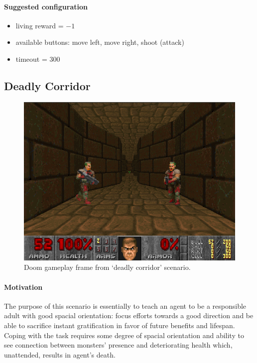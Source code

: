 \documentclass[english,bachelor,a4paper,twoside]{ppfcmthesis}
\begin{document}
		\paragraph{Suggested configuration}
			\begin{itemize}
				\item living reward = $-1$
				\item available buttons: move left, move right, shoot (attack)
				\item timeout = 300
			\end{itemize}
	\newpage

	\subsection{Deadly Corridor}
		\begin{figure}
			\centering
			\includegraphics[scale=0.5]{deadly_corridor.png}
			\caption{Doom gameplay frame from `deadly corridor' scenario.}\label{fig:deadly_corridor}
		\end{figure}

		\paragraph{Motivation} 
			The purpose of this scenario is essentially to teach an agent to be a responsible adult with good spacial orientation: focus efforts towards a good direction and be able to sacrifice instant gratification in favor of future benefits and lifespan. Coping with the task requires some degree of spacial orientation and ability to see connection between monsters' presence and deteriorating health which, unattended, results in agent's death.
\end{document}
